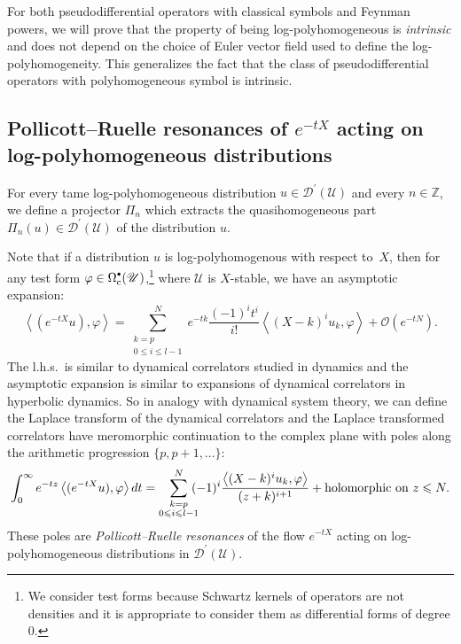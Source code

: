 \documentclass[10pt]{amsart}
\let\pazocal\mathscr
\newcommand{\sbullet}{{\raisebox{1pt}{$\scriptscriptstyle\bullet$}}}
\theoremstyle{definition}
\newcommand\cD{{\pazocal D}}
\renewcommand\c{\mathrm{c}}
\let\euler X
\let\exd u
\let\Re\relax
\DeclareMathOperator{\Re}{Re}
\begin{document}
For both pseudodifferential operators with classical symbols and Feynman powers,
we will prove that the property of being log-polyhomogeneous is \emph{intrinsic} and does not depend on the
choice of Euler vector field used to define the log-polyhomogeneity. This generalizes the fact that the class of pseudodifferential operators
with polyhomogeneous symbol is intrinsic.

\subsection{Pollicott--Ruelle resonances of \texorpdfstring{$e^{-t\euler}$}{exp(-tX)} acting on log-polyhomogeneous distributions}

For every tame log-polyhomogeneous distribution $\exd \in \cD^\prime(\pazocal{U})$ and every $n\in \mathbb{Z}$, we define a projector
$\Pi_n$ which extracts the quasihomogeneous part $\Pi_n(\exd) \in \cD^\prime(\pazocal{U})$ of the distribution $\exd$.

Note that if a distribution $u$ is log-polyhomogenous with respect to~$\euler$, then for any test form $\varphi\in \Omega^{\sbullet}_\c(\pazocal{U})$,\footnote{We consider test forms because Schwartz kernels of operators are not densities and it is appropriate to consider them as differential forms of degree $0$.}
where $\pazocal{U}$ is $\euler$-stable,
we have an asymptotic expansion:
\[
\left\langle (e^{-t\euler}u),\varphi\right\rangle = \sum_{\substack{k=p\\0\leqslant i\leqslant l-1}}^N e^{-tk}\frac{(-1)^it^i}{i!} \left\langle (\euler-k)^iu_{k},\varphi\right\rangle+\pazocal{O}(e^{-tN}).
\]
The l.h.s.~is similar to dynamical correlators studied in dynamics and the asymptotic expansion is similar
to expansions of dynamical correlators in hyperbolic dynamics.
So in analogy with dynamical system theory, we can define the Laplace transform
of the dynamical correlators and the Laplace transformed
correlators have meromorphic continuation to the complex plane with poles
along the arithmetic
progression \hbox{$\{p,p+1,\dots \}$}:
\[
\int_0^\infty e^{-tz}\left\langle (e^{-t\euler}u),\varphi\right\rangle dt=
\sum_{\substack{k=p\\0\leqslant i\leqslant l-1}}^N \hspace*{-2mm}(-1)^i \frac{\left\langle (\euler-k)^i u_{k},\varphi\right\rangle}{(z+k)^{{i+1}}}+\text{holomorphic on }\Re z\leqslant N.
\]
These poles are \emph{Pollicott--Ruelle resonances} of the flow $e^{-t\euler}$ acting on
log-poly\-homogeneous distributions in $\pazocal{D}^\prime(\pazocal{U})$.
\end{document}
